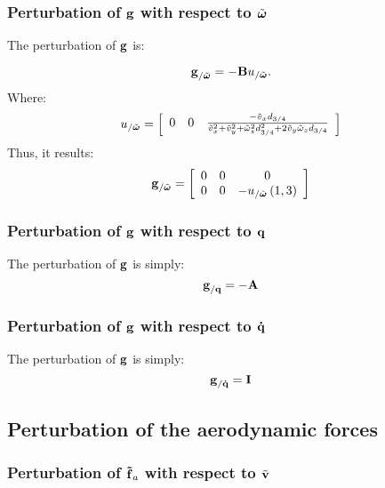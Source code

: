 \subsubsection{Perturbation of $\bm{\mathbf{g}}$ with respect to $\tilde{\bm{\mathbf{\omega}}}$}
The perturbation of $\bm{\mathbf{g}}$ is:
	

\begin{equation}
\bm{\mathbf{g}}_{/\tilde{\bm{\mathbf{\omega}}}} = 
	-\bm{\mathbf{B}} u_{/\tilde{\bm{\mathbf{\omega}}}}.
\end{equation}
Where:
\begin{equation}
	u_{/\tilde{\bm{\mathbf{\omega}}}} = \left[
	\begin{array}{ccc}
	0 & 0 &
	\frac{-\tilde{v}_x d_{3/4}}{\tilde{v}_x^2 + \tilde{v}_y^2 + 
		\tilde{\omega}_z^2 d_{3/4}^2 + 2 \tilde{v}_y \tilde{\omega}_z d_{3/4}} 
	\end{array}
	\right]
\end{equation}
Thus, it results:
\begin{equation}
	\bm{\mathbf{g}}_{/\tilde{\bm{\mathbf{\omega}}}} = \left[
		\begin{array}{ccc}
			0 & 0 & 0\\
			0 & 0 & -u_{/\tilde{\bm{\mathbf{\omega}}}}\left( 1,3 \right) \\
		\end{array} \right]
\end{equation}
			

\subsubsection{Perturbation of $\bm{\mathbf{g}}$ with respect to $\bm{\mathbf{q}}$}
The perturbation of $\bm{\mathbf{g}}$ is simply:
\begin{equation}
\bm{\mathbf{g}}_{/{\bm{\mathbf{q}}}} = -\bm{\mathbf{A}}
\end{equation}
\subsubsection{Perturbation of $\bm{\mathbf{g}}$ with respect to $\bm{\mathbf{\dot{q}}}$}
The perturbation of $\bm{\mathbf{g}}$ is simply:
\begin{equation}
\bm{\mathbf{g}}_{/{\bm{\mathbf{\dot{q}}}}} = \bm{\mathbf{I}}
\end{equation}

\subsection{Perturbation of the aerodynamic forces}

\subsubsection{Perturbation of $\bm{\mathbf{\tilde{f}}}_a$ with respect to $\tilde{\bm{\mathbf{v}}}$}



